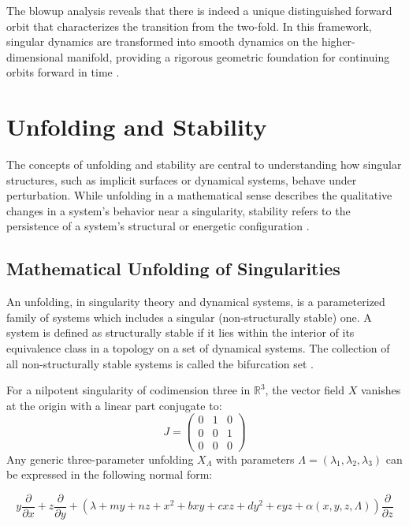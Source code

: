 \documentclass[12pt, a4paper, oneside]{book}
\theoremstyle{plain}
\theoremstyle{definition}
\theoremstyle{remark}
\theoremstyle{definition}
\begin{document}
The blowup analysis reveals that there is indeed a unique distinguished forward orbit that characterizes the transition from the two-fold. In this framework, singular dynamics are transformed into smooth dynamics on the higher-dimensional manifold, providing a rigorous geometric foundation for continuing orbits forward in time \cite{kristiansen2019resolution}.

\section{Unfolding and Stability}

The concepts of unfolding and stability are central to understanding how singular structures, such as implicit surfaces or dynamical systems, behave under perturbation. While unfolding in a mathematical sense describes the qualitative changes in a system's behavior near a singularity, stability refers to the persistence of a system's structural or energetic configuration \cite{ibanez2005shil, soncini2007mechanical}.

\subsection{Mathematical Unfolding of Singularities}

An unfolding, in singularity theory and dynamical systems, is a parameterized family of systems which includes a singular (non-structurally stable) one. A system is defined as structurally stable if it lies within the interior of its equivalence class in a topology on a set of dynamical systems. The collection of all non-structurally stable systems is called the bifurcation set \cite{ibanez2005shil}.

For a nilpotent singularity of codimension three in $\mathbb{R}^3$, the vector field $X$ vanishes at the origin with a linear part conjugate to:
\begin{equation}
    J = \begin{pmatrix} 0 & 1 & 0 \\ 0 & 0 & 1 \\ 0 & 0 & 0 \end{pmatrix}
\end{equation}
Any generic three-parameter unfolding $X_\Lambda$ with parameters $\Lambda = (\lambda_1, \lambda_2, \lambda_3)$ can be expressed in the following normal form:

\begin{equation}
    y \frac{\partial}{\partial x} + z \frac{\partial}{\partial y} + (\lambda + my + nz + x^2 + bxy + cxz + dy^2 + eyz + \alpha(x, y, z, \Lambda)) \frac{\partial}{\partial z}
\end{equation}
\end{document}
